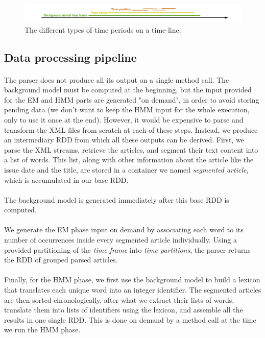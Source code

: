 \begin{figure}
   \includegraphics[width=\textwidth]{time_entities.pdf}
   \caption{\label{fig:time_entities} The different types of time periods on a time-line.}
\end{figure}


\subsection{Data processing pipeline}
\paragraph{}
The parser does not produce all its output on a single method call. The background model must be computed at the beginning, but the input provided for the EM and HMM parts are generated "on demand", in order to avoid storing pending data (we don't want to keep the HMM input for the whole execution, only to use it once at the end). However, it would be expensive to parse and transform the XML files from scratch at each of these steps. Instead, we produce an intermediary RDD from which all these outputs can be derived. First, we parse the XML streams, retrieve the articles, and segment their text content into a list of words. This list, along with other information about the article like the issue date and the title, are stored in a container we named \emph{segmented article}, which is accumulated in our base RDD.

\paragraph{}
The background model is generated immediately after this base RDD is computed.

\paragraph{}
We generate the EM phase input on demand by associating each word to its number of occurrences inside every segmented article individually. Using a provided partitioning of the \emph{time frame} into \emph{time partitions}, the parser returns the RDD of grouped parsed articles.

\paragraph{}
Finally, for the HMM phase, we first use the background model to build a lexicon that translates each unique word into an integer identifier. The segmented articles are then sorted chronologically, after what we extract their lists of words, translate them into lists of identifiers using the lexicon, and assemble all the results in one single RDD. This is done on demand by a method call at the time we run the HMM phase.

